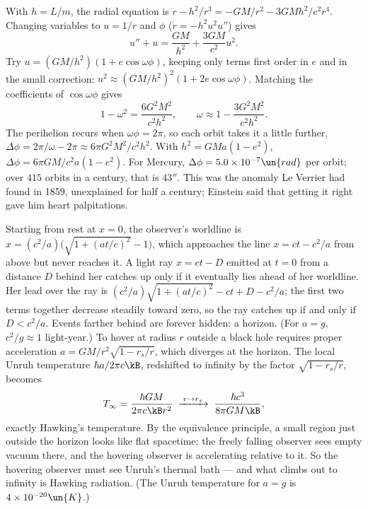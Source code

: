  With $h = L/m$, the radial equation is $\ddot r - h^2/r^3 = -GM/r^2 - 3GMh^2/c^2r^4$. Changing variables to $u = 1/r$ and $\phi$ ($\ddot r = -h^2u^2u''$) gives
\[
  u'' + u = \frac{GM}{h^2} + \frac{3GM}{c^2}u^2.
\]
Try $u = (GM/h^2)(1 + e\cos\omega\phi)$, keeping only terms first order in $e$ and in the small correction: $u^2\approx(GM/h^2)^2(1 + 2e\cos\omega\phi)$. Matching the coefficients of $\cos\omega\phi$ gives
\[
  1 - \omega^2 = \frac{6G^2M^2}{c^2h^2},\qquad\omega\approx1 - \frac{3G^2M^2}{c^2h^2}.
\]
The perihelion recurs when $\omega\phi = 2\pi$, so each orbit takes it a little further, $\Delta\phi = 2\pi/\omega - 2\pi\approx6\pi G^2M^2/c^2h^2$. With $h^2 = GMa(1-e^2)$, $\Delta\phi = 6\pi GM/c^2a(1-e^2)$. For Mercury, $\Delta\phi = 5.0\times10^{-7}\un{rad}$ per orbit; over $415$ orbits in a century, that is $43''$. This was the anomaly Le Verrier had found in 1859, unexplained for half a century; Einstein said that getting it right gave him heart palpitations.

 Starting from rest at $x = 0$, the observer's worldline is $x = (c^2/a)\big(\sqrt{1+(at/c)^2}-1\big)$, which approaches the line $x = ct - c^2/a$ from above but never reaches it. A light ray $x = ct - D$ emitted at $t = 0$ from a distance $D$ behind her catches up only if it eventually lies ahead of her worldline. Her lead over the ray is $(c^2/a)\sqrt{1+(at/c)^2} - ct + D - c^2/a$; the first two terms together decrease steadily toward zero, so the ray catches up if and only if $D<c^2/a$. Events farther behind are forever hidden: a horizon. (For $a = g$, $c^2/g\approx1$ light-year.) To hover at radius $r$ outside a black hole requires proper acceleration $a = GM/r^2\sqrt{1-r_s/r}$, which diverges at the horizon. The local Unruh temperature $\hbar a/2\pi c\kB$, redshifted to infinity by the factor $\sqrt{1-r_s/r}$, becomes
\[
  T_\infty = \frac{\hbar GM}{2\pi c\kB r^2}\;\xrightarrow{\;r\to r_s\;}\;\frac{\hbar c^3}{8\pi GM\kB},
\]
exactly Hawking's temperature. By the equivalence principle, a small region just outside the horizon looks like flat spacetime; the freely falling observer sees empty vacuum there, and the hovering observer is accelerating relative to it. So the hovering observer must see Unruh's thermal bath --- and what climbs out to infinity is Hawking radiation. (The Unruh temperature for $a = g$ is $4\times10^{-20}\un{K}$.)
